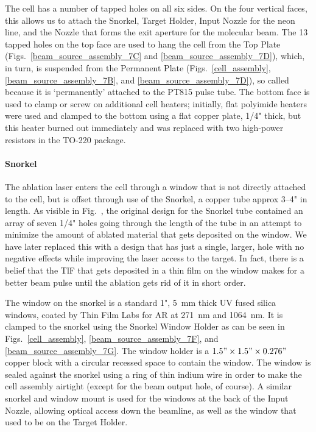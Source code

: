 The cell has a number of tapped holes on all six sides. On the four vertical
faces, this allows us to attach the Snorkel, Target Holder, Input Nozzle for the
neon line, and the Nozzle that forms the exit aperture for the molecular beam.
The 13 tapped holes on the top face are used to hang the cell from the Top Plate
(Figs.~\ref{beam_source_assembly_7C} and \ref{beam_source_assembly_7D}), which,
in turn, is suspended from the Permanent Plate (Figs.~\ref{cell_assembly},
\ref{beam_source_assembly_7B}, and \ref{beam_source_assembly_7D}), so called
because it is `permanently' attached to the PT815 pulse tube. The bottom face is
used to clamp or screw on additional cell heaters; initially, flat polyimide
heaters were used and clamped to the bottom using a flat copper plate, 1/4"
thick, but this heater burned out immediately and was replaced with two
high-power resistors in the TO-220 package.

\paragraph{Snorkel}

The ablation laser enters the cell through a window that is not directly
attached to the cell, but is offset through use of the Snorkel, a copper tube
approx 3--4" in length. As visible in Fig.~, the original
design for the Snorkel tube contained an array of seven 1/4" holes going
through the length of the tube in an attempt to minimize the amount of ablated
material that gets deposited on the window. We have later replaced this with a
design that has just a single, larger, hole with no negative effects while
improving the laser access to the target. In fact, there is a belief that the
TlF that gets deposited in a thin film on the window makes for a better beam
pulse until the ablation gets rid of it in short order.

The window on the snorkel is a standard 1", 5~mm thick UV fused silica windows,
coated by Thin Film Labs for AR at 271~nm and 1064~nm.  It is clamped to the
snorkel using the Snorkel Window Holder as can be seen in
Figs.~\ref{cell_assembly}, \ref{beam_source_assembly_7F}, and
\ref{beam_source_assembly_7G}. The window holder is a
$1.5"\times1.5"\times0.276"$ copper block with a circular recessed space to
contain the window. The window is sealed against the snorkel using a ring of
thin indium wire in order to make the cell assembly airtight (except for the
beam output hole, of course). A similar snorkel and window mount is used for the
windows at the back of the Input Nozzle, allowing optical access down the
beamline, as well as the window that used to be on the Target Holder.

